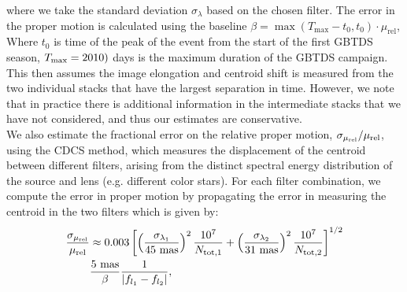 \documentclass[twocolumn]{aastex631}
\begin{document}
where we take the standard deviation $\sigma_\lambda$ based on the chosen filter. The error in the proper motion is calculated using the baseline $\beta = \max(T_{\text{max}} - t_0, t_0) \cdot \mu_{\text{rel}}$, Where $t_0$ is time of the peak of the event from the start of the first GBTDS season, $T_{\rm max} = 2010)$ days is the maximum duration of the GBTDS campaign. This then assumes the image elongation and centroid shift is measured from the two individual stacks that have the largest separation in time. However, we note that in practice there is additional information in the intermediate stacks that we have not considered, and thus our estimates are conservative.\\
\indent We also estimate the fractional error on the relative proper motion, $\sigma_{\mu_{\rm rel}}/\mu_{\rm rel}$, using the CDCS method, which measures the displacement of the centroid between different filters, arising from the distinct spectral energy distribution of the source and lens (e.g. different color stars). For each filter combination, we compute the error in proper motion by propagating the error in measuring the centroid in the two filters which is given by:
\begin{align}\label{eq:cdcs}
    \frac{\sigma_{\mu_{\rm rel}}}{\mu_{\rm rel}} &\approx 0.003
\left[\left(\frac{\sigma_{\lambda_1}}{45~{\rm mas}}\right)^2\frac{10^7}{N_{\rm tot,1}} + \left(\frac{\sigma_{\lambda_2}}{31~{\rm mas}}\right)^2\frac{10^7}{N_{\rm tot,2}} \right]^{1/2} \nonumber\\
&\frac{5~{\rm mas}}{\beta} \frac{1}{|f_{l_1}-f_{l_2}|},   
\end{align}
\end{document}
